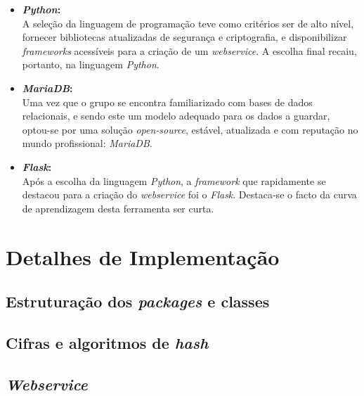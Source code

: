 \begin{itemize}
    \item \textbf{\textit{Python}:}\\
        A seleção da linguagem de programação teve como critérios ser de alto nível, fornecer bibliotecas atualizadas de segurança e criptografia, e disponibilizar \textit{frameworks} acessíveis para a criação de um \textit{webservice}. A escolha final recaiu, portanto, na linguagem \textit{Python}.
    
    \item \textbf{\textit{MariaDB}:}\\
        Uma vez que o grupo se encontra familiarizado com bases de dados relacionais, e sendo este um modelo adequado para os dados a guardar, optou-se por uma solução \textit{open-source}, estável, atualizada e com reputação no mundo profissional: \textit{MariaDB}.
    
    \item \textbf{\textit{Flask}:}\\
        Após a escolha da linguagem \textit{Python}, a \textit{framework} que rapidamente se destacou para a criação do \textit{webservice} foi o \textit{Flask}. Destaca-se o facto da curva de aprendizagem desta ferramenta ser curta.
\end{itemize}


\section{Detalhes de Implementação}
\label{sec::implementacao:detalhes}



\subsection{Estruturação dos \textit{packages} e classes}
\label{ssec::implementacao:detalhes:estrutura}




\subsection{Cifras e algoritmos de \textit{hash}}
\label{ssec::implementacao:detalhes:cifras}




\subsection{\textit{Webservice}}
\label{ssec::implementacao:detalhes:webservice}




